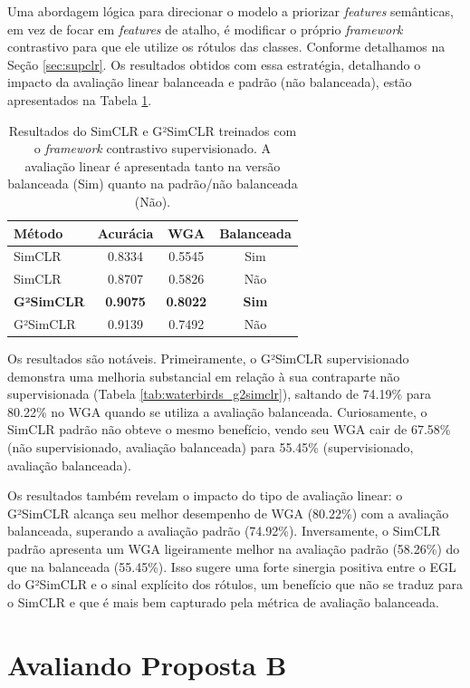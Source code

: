 Uma abordagem lógica para direcionar o modelo a priorizar \textit{features} semânticas, em vez de focar em \textit{features} de atalho, é modificar o próprio \textit{framework} contrastivo para que ele utilize os rótulos das classes. Conforme detalhamos na Seção \ref{sec:supclr}. Os resultados obtidos com essa estratégia, detalhando o impacto da avaliação linear balanceada e padrão (não balanceada), estão apresentados na Tabela \ref{tab:waterbirds_supervised}.

\begin{table}[h]
\centering
\caption{Resultados do SimCLR e G²SimCLR treinados com o \textit{framework} contrastivo supervisionado. A avaliação linear é apresentada tanto na versão balanceada (Sim) quanto na padrão/não balanceada (Não).}
\label{tab:waterbirds_supervised}
\setlength{\tabcolsep}{8pt}
\begin{tabular}{lccc}
\toprule
Método & Acurácia & WGA & Balanceada \\
\midrule
SimCLR & 0.8334 & 0.5545 & Sim \\
SimCLR & 0.8707 & 0.5826 & Não \\
\textbf{G²SimCLR} & \textbf{0.9075} & \textbf{0.8022} & \textbf{Sim} \\
G²SimCLR & 0.9139 & 0.7492 & Não \\
\bottomrule
\end{tabular}
\end{table}

Os resultados são notáveis. Primeiramente, o G²SimCLR supervisionado demonstra uma melhoria substancial em relação à sua contraparte não supervisionada (Tabela \ref{tab:waterbirds_g2simclr}), saltando de 74.19\% para 80.22\% no WGA quando se utiliza a avaliação balanceada. Curiosamente, o SimCLR padrão não obteve o mesmo benefício, vendo seu WGA cair de 67.58\% (não supervisionado, avaliação balanceada) para 55.45\% (supervisionado, avaliação balanceada).

Os resultados também revelam o impacto do tipo de avaliação linear: o G²SimCLR alcança seu melhor desempenho de WGA (80.22\%) com a avaliação balanceada, superando a avaliação padrão (74.92\%). Inversamente, o SimCLR padrão apresenta um WGA ligeiramente melhor na avaliação padrão (58.26\%) do que na balanceada (55.45\%). Isso sugere uma forte sinergia positiva entre o EGL do G²SimCLR e o sinal explícito dos rótulos, um benefício que não se traduz para o SimCLR e que é mais bem capturado pela métrica de avaliação balanceada.


\section{Avaliando Proposta B}

